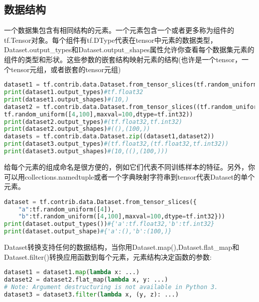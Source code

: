 \subsection{数据结构}
一个数据集包含有相同结构的元素。一个元素包含一个或者更多称为组件的tf.Tensor对象。每个组件有tf.DType代表在tensor中元素的数据类型，Dataset.output\_types和Dataset.output\_shapes属性允许你查看每个数据集元素的组件的类型和形状。这些参数的嵌套结构映射元素的结构(也许是一个tensor，一个tensor元组，或者嵌套的tensor元组)
\begin{lstlisting}[language=Python]
dataset1 = tf.contrib.data.Dataset.from_tensor_slices(tf.random_uniform([4,10]))
print(dataset1.output_types)#tf.float32
print(dataset1.output_shapes)#(10,)
dataset2 = tf.contrib.data.Dataset.from_tensor_slices((tf.random_uniform([4]))
tf.random_uniform([4,100],maxval=100,dtype=tf.int32))
print(dataset2.output_types)#(tf.float32,tf.int32)
print(dataset2.output_shapes)#((),(100,))
datasets = tf.contrib.data.Dataset.zip((dataset1,dataset2))
print(dataset3.output_types)#(tf.float32,(tf.float32,tf.int32))
print(dataset3.output_shapes)#(10,((),(100,)))
\end{lstlisting}
给每个元素的组成命名是很方便的，例如它们代表不同训练样本的特征。另外，你可以用collections.namedtuple或者一个字典映射字符串到tensor代表Dataset的单个元素。
\begin{lstlisting}[language=Python]
dataset = tf.contrib.data.Dataset.from_tensor_slices({
	"a":tf.random_uniform([4]),
	"b":tf.random_uniform([4,100],maxval=100,dtype=tf.int32}))
print(dataset.output_types())#{'a':tf.float32,'b':tf.int32}
print(dataset.output_shape)#{'a':(),'b':(100,)}
\end{lstlisting}
Dataset转换支持任何的数据结构，当你用Dataset.map(),Dataset.flat\_map和Dataset.filter()转换应用函数到每个元素，元素结构决定函数的参数:
\begin{lstlisting}[language=Python]
dataset1 = dataset1.map(lambda x: ...)
dataset2 = dataset2.flat_map(lambda x, y: ...)
# Note: Argument destructuring is not available in Python 3.
dataset3 = dataset3.filter(lambda x, (y, z): ...)
\end{lstlisting}
